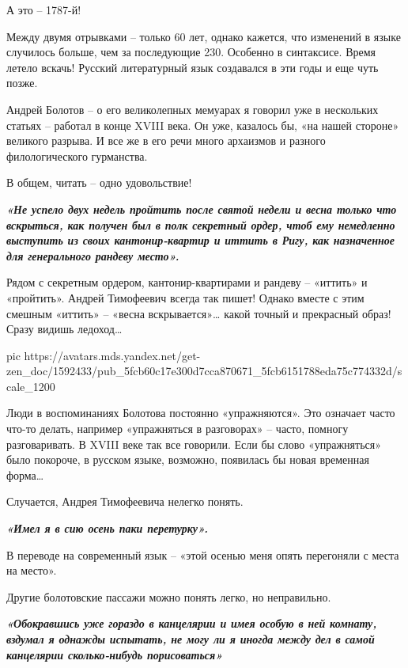 А это – 1787-й!

Между двумя отрывками – только 60 лет, однако кажется, что изменений в языке
случилось больше, чем за последующие 230. Особенно в синтаксисе. Время летело
вскачь! Русский литературный язык создавался в эти годы и еще чуть позже.

Андрей Болотов – о его великолепных мемуарах я говорил уже в нескольких статьях
– работал в конце XVIII века. Он уже, казалось бы, «на нашей стороне» великого
разрыва. И все же в его речи много архаизмов и разного филологического
гурманства.

В общем, читать – одно удовольствие!

\begin{leftbar}
  \begingroup
		\em\Large\bfseries\color{blue} 
				«Не успело двух недель пройтить после святой
				недели и весна только что вскрыться, как получен был в полк секретный
				ордер, чтоб ему немедленно выступить из своих кантонир-квартир и иттить
				в Ригу, как назначенное для генерального рандеву место».
  \endgroup
\end{leftbar}

Рядом с секретным ордером, кантонир-квартирами и рандеву – «иттить» и
«пройтить». Андрей Тимофеевич всегда так пишет! Однако вместе с этим смешным
«иттить» – «весна вскрывается»… какой точный и прекрасный образ! Сразу видишь
ледоход…

\ifcmt
pic https://avatars.mds.yandex.net/get-zen_doc/1592433/pub_5fcb60c17e300d7cca870671_5fcb6151788eda75c774332d/scale_1200
\fi

Люди в воспоминаниях Болотова постоянно «упражняются». Это означает часто
что-то делать, например «упражняться в разговорах» – часто, помногу
разговаривать. В XVIII веке так все говорили. Если бы слово «упражняться» было
покороче, в русском языке, возможно, появилась бы новая временная форма…

Случается, Андрея Тимофеевича нелегко понять.

\begin{leftbar}
  \begingroup
    \em\Large\bfseries\color{blue}
«Имел я в сию осень паки перетурку».
  \endgroup
\end{leftbar}

В переводе на современный язык – «этой осенью меня опять перегоняли с места на
место».

Другие болотовские пассажи можно понять легко, но неправильно.

\begin{leftbar}
  \begingroup
		\em\Large\bfseries\color{blue} 
				«Обокравшись уже гораздо в канцелярии и имея
				особую в ней комнату, вздумал я однажды испытать, не могу ли я иногда
				между дел в самой канцелярии сколько-нибудь порисоваться»
  \endgroup
\end{leftbar}

